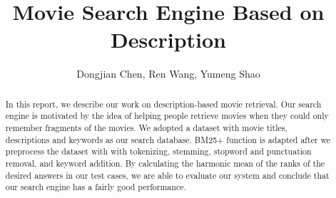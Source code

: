 \documentclass[sigconf,nonacm]{acmart}
\begin{document}
\title{Movie Search Engine Based on Description}

\author{Dongjian Chen, Ren Wang, Yumeng Shao}



\renewcommand{\shortauthors}{Dongjian Chen, Ren Wang, Yumeng Shao}

\begin{abstract}
  In this report, we describe our work on description-based movie retrieval. Our search engine is motivated by the idea of helping people retrieve movies when they could only remember fragments of the movies. We adopted a dataset with movie titles, descriptions and keywords as our search database. BM25+ function is adapted after we preprocess the dataset with with tokenizing, stemming, stopword and punctuation removal, and keyword addition. By calculating the harmonic mean of the ranks of the desired answers in our test cases, we are able to evaluate our system and conclude that our search engine has a fairly good performance.
\end{abstract}




\maketitle
\end{document}
